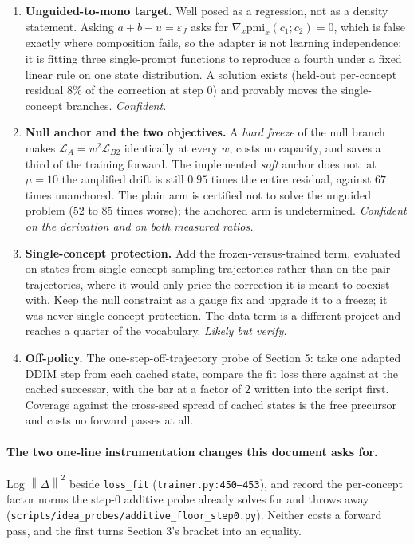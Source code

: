\documentclass[11pt]{article}
\newcommand{\eps}{\varepsilon}
\newcommand{\norm}[1]{\left\lVert #1 \right\rVert}
\newcommand{\pmi}{\mathrm{pmi}}
\theoremstyle{plain}
\theoremstyle{remark}
\begin{document}
\begin{enumerate}
  \item \textbf{Unguided-to-mono target.} Well posed as a regression, not as a density statement.
    Asking $a+b-u = \eps_J$ asks for $\nabla_x \pmi_x(c_1;c_2) = 0$, which is false exactly where
    composition fails, so the adapter is not learning independence; it is fitting three
    single-prompt functions to reproduce a fourth under a fixed linear rule on one state
    distribution. A solution exists (held-out per-concept residual $8\%$ of the correction at step
    0) and provably moves the single-concept branches. \emph{Confident.}
  \item \textbf{Null anchor and the two objectives.} A \emph{hard freeze} of the null branch makes
    $\mathcal{L}_A = w^2 \mathcal{L}_{B2}$ identically at every $w$, costs no capacity, and saves a
    third of the training forward. The implemented \emph{soft} anchor does not: at $\mu = 10$ the
    amplified drift is still $0.95$ times the entire residual, against $67$ times unanchored. The
    plain arm is certified not to solve the unguided problem ($52$ to $85$ times worse); the
    anchored arm is undetermined. \emph{Confident on the derivation and on both measured ratios.}
  \item \textbf{Single-concept protection.} Add the frozen-versus-trained term, evaluated on states
    from single-concept sampling trajectories rather than on the pair trajectories, where it would
    only price the correction it is meant to coexist with. Keep the null constraint as a gauge fix
    and upgrade it to a freeze; it was never single-concept protection. The data term is a different
    project and reaches a quarter of the vocabulary. \emph{Likely but verify.}
  \item \textbf{Off-policy.} The one-step-off-trajectory probe of Section 5: take one adapted DDIM
    step from each cached state, compare the fit loss there against at the cached successor, with the
    bar at a factor of $2$ written into the script first. Coverage against the cross-seed spread of
    cached states is the free precursor and costs no forward passes at all.
\end{enumerate}

\paragraph{The two one-line instrumentation changes this document asks for.}
Log $\norm{\Delta}^2$ beside \texttt{loss\_fit} (\texttt{trainer.py:450--453}), and record the
per-concept factor norms the step-0 additive probe already solves for and throws away
(\texttt{scripts/idea\_probes/additive\_floor\_step0.py}). Neither costs a forward pass, and the
first turns Section 3's bracket into an equality.
\end{document}
